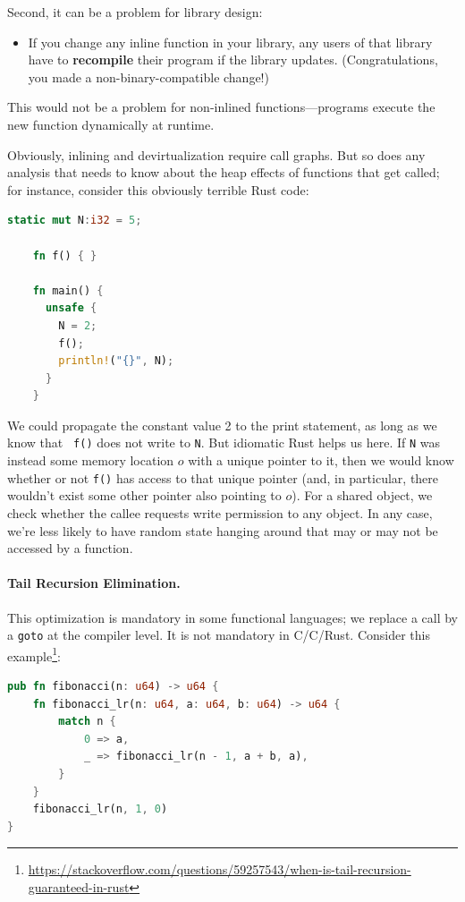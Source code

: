 \documentclass[a4paper]{report}
\newcommand{\CPP}{C\nolinebreak\hspace{-.05em}\raisebox{.4ex}{\tiny\bf +}\nolinebreak\hspace{-.10em}\raisebox{.4ex}{\tiny\bf +}}
\def\CPP{{C\nolinebreak[4]\hspace{-.05em}\raisebox{.4ex}{\tiny\bf ++}}}
\begin{document}
Second, it can be a problem for library design:
  \begin{itemize}[noitemsep]
    \item If you change any inline function in your library, any users
      of that library have to {\bf recompile} their program if the
      library updates. (Congratulations, you made a non-binary-compatible change!)
  \end{itemize}
This would not be a problem for non-inlined functions---programs execute the new function
dynamically at runtime.

Obviously, inlining and devirtualization require call graphs. But so
does any analysis that needs to know about the heap effects of
functions that get called; for instance, consider this obviously terrible Rust code:

{\small
\begin{lstlisting}[language=Rust]
    static mut N:i32 = 5;

    fn f() { }

    fn main() {
      unsafe { 
        N = 2;
        f();
        println!("{}", N);  
      }
    }
    \end{lstlisting}
}
We could propagate the constant value 2 to the print statement,
as long as we know that {\tt
f()} does not write to {\tt N}. But idiomatic Rust helps us
here. If \texttt{N} was instead some memory location $o$ with a unique
pointer to it, then we would know whether or not \texttt{f()} has
access to that unique pointer (and, in particular, there wouldn't exist some other
pointer also pointing to $o$). For a shared object, we check whether the callee
requests write permission to any object. In any case, we're less likely to have random
state hanging around that may or may not be accessed by a function.

\paragraph{Tail Recursion Elimination.} This optimization is mandatory
in some functional languages; we replace a call by a {\tt goto} at the
compiler level. It is not mandatory in C/\CPP/Rust.
Consider this example\footnote{\url{https://stackoverflow.com/questions/59257543/when-is-tail-recursion-guaranteed-in-rust}}:

{\small
\begin{lstlisting}[language=Rust]
pub fn fibonacci(n: u64) -> u64 {
    fn fibonacci_lr(n: u64, a: u64, b: u64) -> u64 {
        match n {
            0 => a,
            _ => fibonacci_lr(n - 1, a + b, a),
        }
    }
    fibonacci_lr(n, 1, 0)
}
\end{lstlisting}
}
\end{document}
